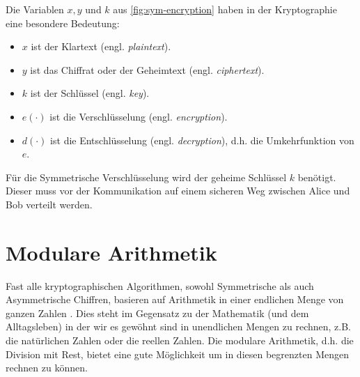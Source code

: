 

\noindent
Die Variablen $x, y$ und $k$ aus \autoref{fig:sym-encryption} haben in der
Kryptographie eine besondere Bedeutung:

\begin{itemize}[itemsep = 0pt]
  \item $x$ ist der Klartext (engl. \textit{plaintext}).
  \item $y$ ist das Chiffrat oder der Geheimtext (engl. \textit{ciphertext}).
  \item $k$ ist der Schlüssel (engl. \textit{key}).
  \item $e(\cdot)$ ist die Verschlüsselung (engl. \textit{encryption}).
  \item $d(\cdot)$ ist die Entschlüsselung (engl. \textit{decryption}),
        d.h. die Umkehrfunktion von $e$.
\end{itemize}

\noindent
Für die Symmetrische Verschlüsselung wird der geheime Schlüssel $k$ benötigt. Dieser
muss vor der Kommunikation auf einem sicheren Weg zwischen Alice und Bob verteilt werden.

\section{Modulare Arithmetik}
Fast alle kryptographischen Algorithmen, sowohl Symmetrische als auch Asymmetrische Chiffren,
basieren auf Arithmetik in einer endlichen Menge von ganzen Zahlen \parencite[13]{BOOK:crypto}.
Dies steht im Gegensatz zu der Mathematik (und dem Alltagsleben)
in der wir es gewöhnt sind in unendlichen
Mengen zu rechnen, z.B. die natürlichen Zahlen oder die reellen Zahlen. Die modulare Arithmetik,
d.h. die Division mit Rest, bietet eine gute Möglichkeit um in diesen begrenzten Mengen rechnen
zu können.


